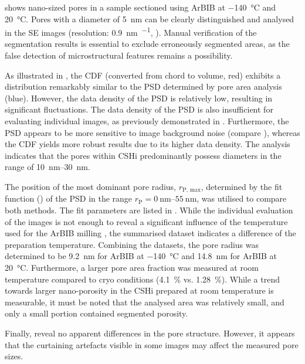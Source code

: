  shows nano-sized pores in a sample sectioned using \ac{ArBIB} at \qty{-140}{\celsius} and \qty{20}{\celsius}.
Pores with a diameter of \qty{5}{\nano\meter} can be clearly distinguished and analysed in the \ac{SE} images (resolution: \qty{0.9}{\nano\meter\per\px}, ).
Manual verification of the segmentation results is essential to exclude erroneously segmented areas, as the false detection of microstructural features remains a possibility.

As illustrated in , the \ac{CDF} (converted from chord to volume, red) exhibits a distribution remarkably similar to the \ac{PSD} determined by pore area analysis (blue).
However, the data density of the \ac{PSD} is relatively low, resulting in significant fluctuations.
The data density of the \ac{PSD} is also insufficient for evaluating individual images, as previously demonstrated in \cite{kleiner.2021a}. 
Furthermore, the \ac{PSD} appears to be more sensitive to image background noise (compare ), whereas the \ac{CDF} yields more robust results due to its higher data density.
The analysis indicates that the pores within \ac{CSHi} predominantly possess diameters in the range of \qtyrange{10}{30}{\nano\meter}.

The position of the most dominant pore radius, $r_\text{P, max}$, determined by the fit function () of the \ac{PSD} in the range $r_\text{P}=\qtyrange{0}{55}{\nano\meter}$, was utilised to compare both methods.
The fit parameters are listed in .
While the individual evaluation of the images is not enough to reveal a significant influence of the temperature used for the \ac{ArBIB} milling \cite{kleiner.2021a}, the summarised dataset indicates a difference of the preparation temperature.
Combining the datasets, the pore radius was determined to be \qty{9.2}{\nano\meter} for \ac{ArBIB} at \qty{-140}{\celsius} and \qty{14.8}{\nano\meter} for \ac{ArBIB} at \qty{20}{\celsius}.
Furthermore, a larger pore area fraction was measured at room temperature compared to cryo conditions (\qty{4.1}{\percent} vs. \qty{1.28}{\percent}).
While a trend towards larger nano-porosity in the \ac{CSHi} prepared at room temperature is measurable, it must be noted that the analysed area was relatively small, and only a small portion contained segmented porosity.

Finally,  reveal no apparent differences in the pore structure.
However, it appears that the curtaining artefacts visible in some images may affect the measured pore sizes.



